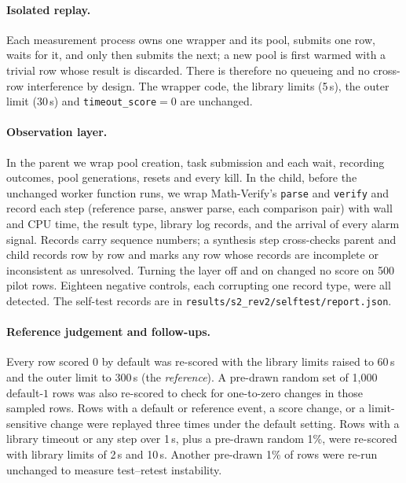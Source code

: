 \documentclass[10pt,a4paper]{article}
\newcommand{\mv}{Math-Verify}
\begin{document}
\paragraph{Isolated replay.}
Each measurement process owns one wrapper and its pool, submits one row,
waits for it, and only then submits the next; a new pool is first warmed with
a trivial row whose result is discarded. There is therefore no queueing and
no cross-row interference by design. The wrapper code, the library limits
(5\,s), the outer limit (30\,s) and \texttt{timeout\_score}$=0$ are unchanged.

\paragraph{Observation layer.}
In the parent we wrap pool creation, task submission and each wait, recording
outcomes, pool generations, resets and every kill. In the child, before the
unchanged worker function runs, we wrap \mv{}'s \texttt{parse} and
\texttt{verify} and record each step (reference parse, answer parse, each
comparison pair) with wall and CPU time, the result type, library log
records, and the arrival of every alarm signal. Records carry sequence
numbers; a synthesis step cross-checks parent and child records row by row
and marks any row whose records are incomplete or inconsistent as unresolved.
Turning the layer off and on changed no score on 500 pilot rows. Eighteen
negative controls, each corrupting one record type, were all detected.
The self-test records are in \texttt{results/s2\_rev2/selftest/report.json}.

\paragraph{Reference judgement and follow-ups.}
Every row scored $0$ by default was re-scored with the library limits raised
to 60\,s and the outer limit to 300\,s (the \emph{reference}). A pre-drawn
random set of 1,000 default-$1$ rows was also re-scored to check for
one-to-zero changes in those sampled rows. Rows with a default or reference event,
a score change, or a limit-sensitive change were replayed three times under
the default setting. Rows with a library timeout or any step over 1\,s, plus a
pre-drawn random 1\%, were re-scored with library limits of 2\,s and 10\,s.
Another pre-drawn 1\% of rows were re-run unchanged to measure test--retest
instability.
\end{document}
